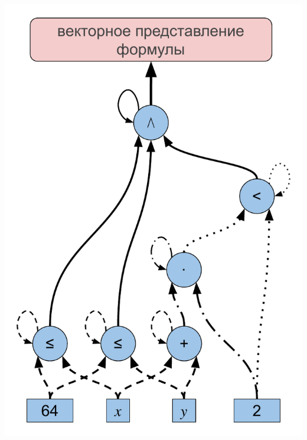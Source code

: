 \documentclass[14pt,aspectratio=169,hyperref={pdftex,unicode},xcolor=dvipsnames]{beamer}
\begin{document}
\begin{frame}

\begin{center}
  \includegraphics[scale=0.45]{./assets/formula-ast-talk.pdf}
\end{center}

\end{frame}
\end{document}
